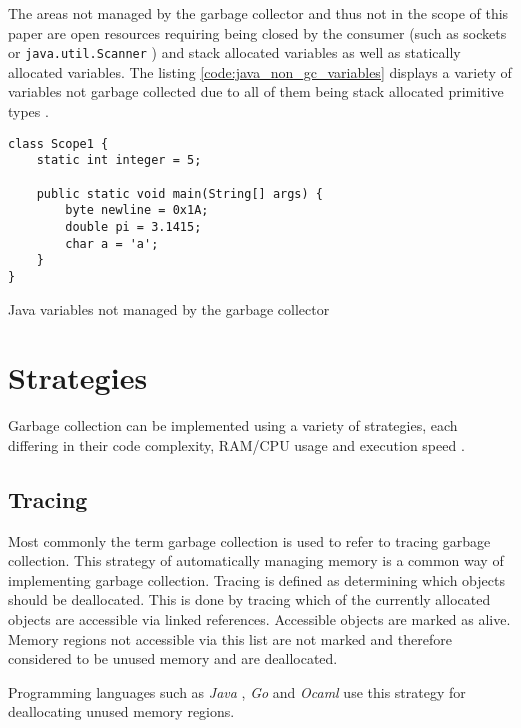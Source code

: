 The areas not managed by the garbage collector and thus not in the scope of
this paper are open resources requiring being closed by the consumer (such as
sockets or \texttt{java.util.Scanner} \cite[close]{java-util-scanner}) and
stack allocated variables as well as statically allocated variables. The
listing \autoref{code:java_non_gc_variables} displays a variety of variables
not garbage collected due to all of them being stack allocated primitive types
\cite[4.2. Primitive Types and Values]{java_language_spec_2023}.

\begin{listing}[H] 
    \begin{verbatim} 
class Scope1 {
    static int integer = 5;

    public static void main(String[] args) {
        byte newline = 0x1A;
        double pi = 3.1415;
        char a = 'a';
    }
}
    \end{verbatim}
    \caption{Java variables not managed by the garbage collector}
    \label{code:java_non_gc_variables}
\end{listing}

\section{Strategies}

Garbage collection can be implemented using a variety of strategies, each
differing in their code complexity, RAM/CPU usage and execution speed \cite[4.3
Benchmarks]{gc-performance_2004} \cite[Motivation and Historical
Perspective]{gc-hardware_2018}.

\subsection{Tracing}

Most commonly the term garbage collection is used to refer to tracing garbage
collection. This strategy of automatically managing memory is a common way of
implementing garbage collection. Tracing is defined as determining which
objects should be deallocated. This is done by tracing which of the currently
allocated objects are accessible via linked references. Accessible objects are
marked as alive. Memory regions not accessible via this list are not marked and
therefore considered to be unused memory and are deallocated. \cite[Garbage
Collection Background]{gc-hardware_2018}

Programming languages such as \textit{Java} \cite[2.2 Full GC
algorithm]{java_gc_comparison_2019}, \textit{Go} \cite[Tracing Garbage
Collection]{go_gcguide_2022} and \textit{Ocaml} \cite[Garbage Collection,
Reference Counting, and Explicit Allocation]{ocmal_gc_unknown} use this
strategy for deallocating unused memory regions.

